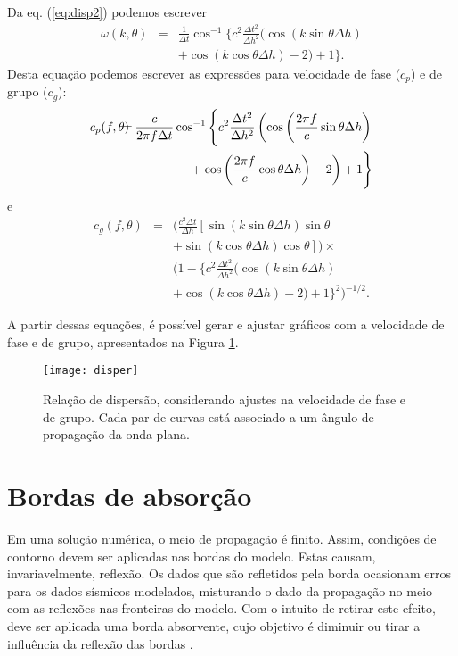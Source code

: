 Da eq. (\ref{eq:disp2}) podemos escrever 
\begin{eqnarray}
\omega (k,\theta)&=&\frac{1}{\Delta t} \cos^{-1}\Big\{ c^2\frac{\Delta t^2}{\Delta h^2}(\cos(k\sin \theta\Delta h) \nonumber\\ 
&&+ \cos(k \cos\theta\Delta h)-2)+ 1\Big\}.
\label{eq:disp3}
\end{eqnarray}
Desta equa\c{c}\~ao podemos escrever as express\~oes para velocidade de fase ($c_p$) e de grupo ($c_g$):
\begin{eqnarray}
c_p (f,\theta)\hspace{-8pt}&=&\hspace{-8pt}\frac{c}{2\pi f\Delta t} \cos^{-1}\Bigg\{ c^2\frac{\Delta t^2}{\Delta h^2}\left(\cos\left(\frac{2\pi f}{c}\sin \theta\Delta h\right)\right. \nonumber\\ 
&&+ \left.\cos\left(\frac{2\pi f}{c} \cos\theta\Delta h\right)-2\right)+ 1\Bigg\}
\label{eq:cp}
\end{eqnarray}
e
\begin{eqnarray}
c_g(f,\theta) &=& \Bigg(\frac{c^2\Delta t}{\Delta h} \left[ \sin(k\sin \theta\Delta h) \sin \theta \right. \nonumber \\ 
&& \left. + \sin(k\cos \theta\Delta h)\cos \theta\right]\Bigg) \times \nonumber \\
&& \Bigg(1 - \Big\{ c^2\frac{\Delta t^2}{\Delta h^2}(\cos(k\sin \theta\Delta h) \nonumber\\ 
&&+ \cos(k \cos\theta\Delta h)-2)+ 1\Big\}^2\Bigg)^{-1/2}.
\label{eq:cg}
\end{eqnarray}

A partir dessas equações, é possível gerar e ajustar gráficos com a velocidade de fase e de grupo, apresentados na Figura \ref{fig:disp}. 

\begin{figure}[ht!]
	\centering
	\texttt{[image: disper]}
	\caption{Relação de dispersão, considerando ajustes na velocidade de fase e de grupo. Cada par de curvas está associado a um ângulo de propagação da onda plana.}
	\label{fig:disp}
\end{figure}

\section{Bordas de absorção}
Em uma solu\c{c}\~ao num\'erica, o meio de propaga\c{c}\~ao \'e finito. Assim, 
condi\c{c}\~oes de contorno devem ser aplicadas nas bordas do modelo. Estas causam, invariavelmente, reflex\~ao. 
Os dados que são refletidos pela borda ocasionam erros para os dados sísmicos
modelados, misturando o dado da propagação no meio com as reflex\~oes nas 
fronteiras do modelo. Com o intuito de retirar este efeito, deve ser aplicada 
uma borda absorvente, cujo objetivo é diminuir ou tirar a influência da 
reflexão das bordas \citep{komatitsch2007unsplit}.


